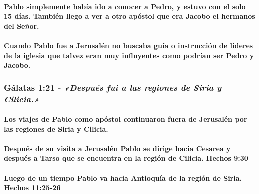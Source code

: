 \documentclass[11a pt,twoside]{article}
\newcommand{\scripture}[1]{%
  {\fontsize{12pt}{16pt}\selectfont\ScriptureFont\itshape #1}%
}
\let\oldsubsubsection\subsubsection
\renewcommand{\subsubsection}{\needspace{4\baselineskip}\oldsubsubsection}
\let\oldparagraph\paragraph
\renewcommand{\paragraph}{\needspace{3\baselineskip}\oldparagraph}
\begin{document}
\paragraph{Pablo simplemente había ido a conocer a Pedro, y estuvo con
el solo 15 días. También llego a ver a otro apóstol que era Jacobo el
hermanos del
Señor.}\label{pablo-simplemente-habuxeda-ido-a-conocer-a-pedro-y-estuvo-con-el-solo-15-duxedas.-tambiuxe9n-llego-a-ver-a-otro-apuxf3stol-que-era-jacobo-el-hermanos-del-seuxf1or.}

\paragraph{Cuando Pablo fue a Jerusalén no buscaba guía o instrucción de
lideres de la iglesia que talvez eran muy influyentes como podrían ser
Pedro y
Jacobo.}\label{cuando-pablo-fue-a-jerusaluxe9n-no-buscaba-guuxeda-o-instrucciuxf3n-de-lideres-de-la-iglesia-que-talvez-eran-muy-influyentes-como-podruxedan-ser-pedro-y-jacobo.}

\subsubsection{\texorpdfstring{Gálatas 1:21 -
\scripture{«Después fui a las regiones de Siria y Cilicia.»}}{Gálatas 1:21 - }}\label{guxe1latas-121---despuuxe9s-fui-a-las-regiones-de-siria-y-cilicia.}

\paragraph{Los viajes de Pablo como apóstol continuaron fuera de
Jerusalén por las regiones de Siria y
Cilicia.}\label{los-viajes-de-pablo-como-apuxf3stol-continuaron-fuera-de-jerusaluxe9n-por-las-regiones-de-siria-y-cilicia.}

\paragraph{Después de su visita a Jerusalén Pablo se dirige hacia
Cesarea y después a Tarso que se encuentra en la región de Cilicia.
Hechos
9:30}\label{despuuxe9s-de-su-visita-a-jerusaluxe9n-pablo-se-dirige-hacia-cesarea-y-despuuxe9s-a-tarso-que-se-encuentra-en-la-regiuxf3n-de-cilicia.-hechos-930}

\paragraph{Luego de un tiempo Pablo va hacia Antioquía de la región de
Siria. Hechos
11:25-26}\label{luego-de-un-tiempo-pablo-va-hacia-antioquuxeda-de-la-regiuxf3n-de-siria.-hechos-1125-26}
\end{document}

